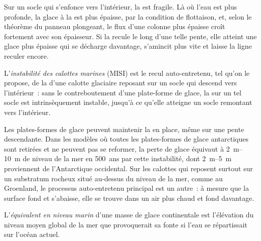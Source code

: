 Sur un socle qui s'enfonce vers l'intérieur, la  est fragile.
Là où l'eau est plus profonde, la glace à la  est plus épaisse,
par la condition de flottaison, et, selon le théorème du panneau plongeant, le flux
d'une colonne plus épaisse croît fortement avec son épaisseur.
Si la  recule le long d'une telle pente, elle atteint une glace plus épaisse
qui se décharge davantage, s'amincit plus vite et laisse la ligne reculer encore.

\begin{definition}\label{def:b3:glaciology:misi}
L'\emph{instabilité des calottes marines}
(MISI) est le recul auto-entretenu, tel qu'on le propose, de la  d'une calotte glaciaire reposant sur un socle qui descend vers
l'intérieur~: sans le contreboutement d'une plate-forme de glace, la  sur un tel socle est intrinsèquement instable, jusqu'à ce qu'elle atteigne un socle remontant vers l'intérieur.
\end{definition}

Les plates-formes de glace peuvent maintenir la  en place,
même sur une pente descendante. Dans les modèles où toutes les plates-formes de glace antarctiques sont retirées et ne peuvent pas se reformer,
la perte de glace équivaut à \qtyrange{2}{10}{m} de niveau de la mer en 500~ans par
cette instabilité, dont \qtyrange{2}{5}{m} proviennent de l'Antarctique occidental.
Sur les calottes qui reposent surtout sur un substratum rocheux situé au-dessus du niveau de la mer,
comme au Groenland, le processus auto-entretenu principal est un autre~: à mesure que la surface
fond et s'abaisse, elle se trouve dans un air plus chaud et fond davantage.

\begin{definition}\label{def:b3:glaciology:sle}
L'\emph{équivalent en niveau marin} d'une masse
de glace continentale est l'élévation du niveau moyen global de la mer que provoquerait sa
fonte si l'eau se répartissait sur l'océan actuel.
\end{definition}

